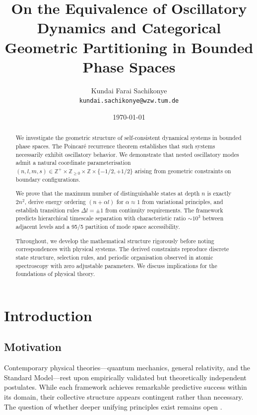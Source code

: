 \documentclass[11pt,a4paper]{article}
\title{\textbf{On the Equivalence of Oscillatory Dynamics and Categorical Geometric Partitioning in Bounded Phase Spaces}}
\author{
    Kundai Farai Sachikonye\\
    \texttt{kundai.sachikonye@wzw.tum.de}
}
\date{\today}
\theoremstyle{remark}
\begin{document}
\maketitle

\begin{abstract}
We investigate the geometric structure of self-consistent dynamical systems in bounded phase spaces. The Poincar\'{e} recurrence theorem establishes that such systems necessarily exhibit oscillatory behavior. We demonstrate that nested oscillatory modes admit a natural coordinate parameterisation $(n, l, m, s) \in \mathbb{Z}^+ \times \mathbb{Z}_{\geq 0} \times \mathbb{Z} \times \{-1/2, +1/2\}$ arising from geometric constraints on boundary configurations.

We prove that the maximum number of distinguishable states at depth $n$ is exactly $2n^2$, derive energy ordering $(n + \alpha l)$ for $\alpha \approx 1$ from variational principles, and establish transition rules $\Delta l = \pm 1$ from continuity requirements. The framework predicts hierarchical timescale separation with characteristic ratio $\sim 10^3$ between adjacent levels and a 95/5 partition of mode space accessibility.

Throughout, we develop the mathematical structure rigorously before noting correspondences with physical systems. The derived constraints reproduce discrete state structure, selection rules, and periodic organisation observed in atomic spectroscopy with zero adjustable parameters. We discuss implications for the foundations of physical theory.
\end{abstract}


\tableofcontents
\newpage

\section{Introduction}

\subsection{Motivation}

Contemporary physical theories—quantum mechanics, general relativity, and the Standard Model—rest upon empirically validated but theoretically independent postulates. While each framework achieves remarkable predictive success within its domain, their collective structure appears contingent rather than necessary. The question of whether deeper unifying principles exist remains open \citep{Wigner1960}.
\end{document}
